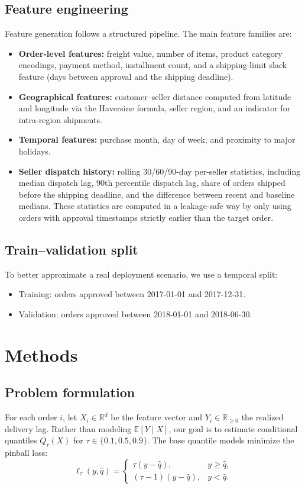 \documentclass[10pt,twocolumn]{article}
\begin{document}
\subsection{Feature engineering}
Feature generation follows a structured pipeline. The main feature families are:
\begin{itemize}
  \item \textbf{Order-level features:} freight value, number of items, product category encodings, payment method, installment count, and a shipping-limit slack feature (days between approval and the shipping deadline).
  \item \textbf{Geographical features:} customer--seller distance computed from latitude and longitude via the Haversine formula, seller region, and an indicator for intra-region shipments.
  \item \textbf{Temporal features:} purchase month, day of week, and proximity to major holidays.
  \item \textbf{Seller dispatch history:} rolling 30/60/90-day per-seller statistics, including median dispatch lag, 90th percentile dispatch lag, share of orders shipped before the shipping deadline, and the difference between recent and baseline medians. These statistics are computed in a leakage-safe way by only using orders with approval timestamps strictly earlier than the target order.
\end{itemize}

\subsection{Train--validation split}
To better approximate a real deployment scenario, we use a temporal split:
\begin{itemize}
  \item Training: orders approved between 2017-01-01 and 2017-12-31.
  \item Validation: orders approved between 2018-01-01 and 2018-06-30.
\end{itemize}

\section{Methods}
\subsection{Problem formulation}
For each order $i$, let $X_i \in \mathbb{R}^d$ be the feature vector and $Y_i \in \mathbb{R}_{\ge 0}$ the realized delivery lag. Rather than modeling $\mathbb{E}[Y \mid X]$, our goal is to estimate conditional quantiles $Q_\tau(X)$ for $\tau \in \{0.1, 0.5, 0.9\}$. The base quantile models minimize the pinball loss:
\begin{equation}
  \ell_\tau(y,\hat{q}) = 
  \begin{cases}
    \tau (y - \hat{q}), & y \ge \hat{q},\\[2pt]
    (\tau - 1)(y - \hat{q}), & y < \hat{q}.
  \end{cases}
\end{equation}
\end{document}
